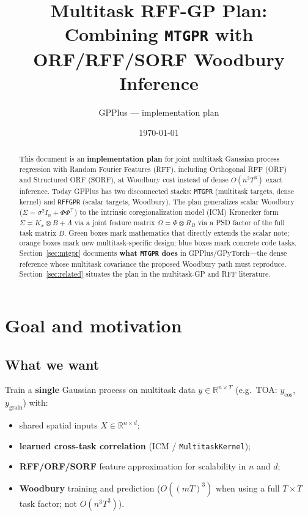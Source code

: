 \documentclass[11pt]{article}
\title{Multitask RFF-GP Plan:\\[0.3em]
Combining \texttt{MTGPR} with ORF/RFF/SORF Woodbury Inference}
\author{GPPlus --- implementation plan}
\date{\today}
\theoremstyle{plain}
\newcommand{\noise}{\sigma^2}
\newcommand{\Sig}{\Sigma}
\newcommand{\Ph}{\Phi}
\newcommand{\Om}{\Omega}
\newcommand{\RB}{R_B}
\begin{document}
\maketitle

\begin{abstract}
This document is an \textbf{implementation plan} for joint multitask Gaussian process regression
with Random Fourier Features (RFF), including Orthogonal RFF (ORF) and Structured ORF (SORF),
at Woodbury cost instead of dense $O(n^3 T^3)$ exact inference.
Today GPPlus has two disconnected stacks: \texttt{MTGPR} (multitask targets, dense kernel) and
\texttt{RFFGPR} (scalar targets, Woodbury). The plan generalizes scalar Woodbury
($\Sig = \noise I_n + \Ph\Ph^\top$) to the intrinsic coregionalization model (ICM)
Kronecker form $\Sig = K_x \otimes B + \Lambda$ via a joint feature matrix
$\Om = \Ph \otimes \RB$ via a PSD factor of the full task matrix $B$.
Green boxes mark mathematics that directly extends the scalar note;
orange boxes mark new multitask-specific design; blue boxes mark concrete code tasks.
Section~\ref{sec:mtgpr} documents \textbf{what \texttt{MTGPR} does} in GPPlus/GPyTorch---the dense
reference whose multitask covariance the proposed Woodbury path must reproduce.
Section~\ref{sec:related} situates the plan in the multitask-GP and RFF literature.
\end{abstract}

\tableofcontents
\newpage

\section{Goal and motivation}

\subsection{What we want}

Train a \textbf{single} Gaussian process on multitask data
$y \in \mathbb{R}^{n \times T}$ (e.g.\ TOA: $y_{\cos}$, $y_{\mathrm{grain}}$) with:
\begin{itemize}[nosep]
  \item shared spatial inputs $X \in \mathbb{R}^{n \times d}$;
  \item \textbf{learned cross-task correlation} (ICM / \texttt{MultitaskKernel});
  \item \textbf{RFF/ORF/SORF} feature approximation for scalability in $n$ and $d$;
  \item \textbf{Woodbury} training and prediction ($O((mT)^3)$ when using a full $T\times T$ task factor; not $O(n^3 T^3)$).
\end{itemize}
\end{document}
